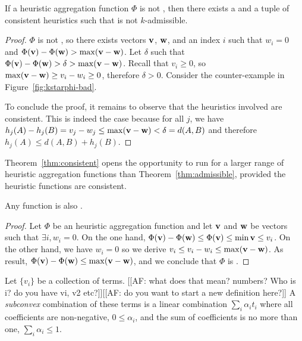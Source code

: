 \begin{theorem}
  \label{thm:consistent-dual}
  If a heuristic aggregation function $\Phi$ is not \axiomcons, then there exists a \kgs and a tuple of consistent heuristics such that \kastarphi is not $k$-admissible.
\end{theorem}
\begin{proof}
  $\Phi$ is not \axiomcons, so there exists vectors $\mathbf{v}$, $\mathbf{w}$, and an index $i$ such that $w_i = 0$ and $\Phi(\mathbf{v}) - \Phi(\mathbf{w}) > \max (\mathbf{v} - \mathbf{w})$.
  Let $\delta$ such that $\Phi(\mathbf{v}) - \Phi(\mathbf{w}) > \delta > \max (\mathbf{v} - \mathbf{w})$.
  Recall that $v_i \geq 0$, so $\max (\mathbf{v} - \mathbf{w}) \geq v_i - w_i \geq 0$, therefore $\delta > 0$.
  Consider the counter-example in Figure~\ref{fig:kstarphi-bad}.

  To conclude the proof, it remains to observe that the heuristics involved are consistent.
  This is indeed the case because for all $j$, we have $h_j(A) - h_j(B) = v_j - w_j \leq \max (\mathbf{v} - \mathbf{w}) < \delta = d(A, B)$ and therefore $h_j(A) \leq d(A, B) + h_j(B)$.
\end{proof}

Theorem~\ref{thm:consistent} opens the opportunity to run \kastar for a larger range of heuristic aggregation functions than Theorem~\ref{thm:admissible}, provided the heuristic functions are consistent.

\begin{observation}
  Any \axiomadm function is also \axiomcons.
\end{observation}
\begin{proof}
  Let $\Phi$ be an \axiomadm heuristic aggregation function and let $\mathbf{v}$ and $\mathbf{w}$ be vectors such that $\exists i, w_i = 0$.
  On the one hand, $\Phi(\mathbf{v}) - \Phi(\mathbf{w}) \leq \Phi(\mathbf{v}) \leq \min \mathbf{v} \leq v_i$.
  On the other hand, we have $w_i = 0$ so we derive $v_i \leq v_i - w_i \leq \max (\mathbf{v} - \mathbf{w})$.
  As result, $\Phi(\mathbf{v}) - \Phi(\mathbf{w}) \leq \max (\mathbf{v} - \mathbf{w})$, and we conclude that $\Phi$ is \axiomcons.
\end{proof}

Let $\{ v_i \}$ be a collection of terms. [[AF: what does that mean? numbers? Who is i? do you have vi, v2 etc?]][[AF: do you want to start a new definition here?]]
A \emph{subconvex} combination of these terms is a linear combination $\sum_i \alpha_i t_i$ where all coefficients are non-negative, $0 \leq \alpha_i$, and the sum of coefficients is no more than one, $\sum_i \alpha_i \leq 1$.

